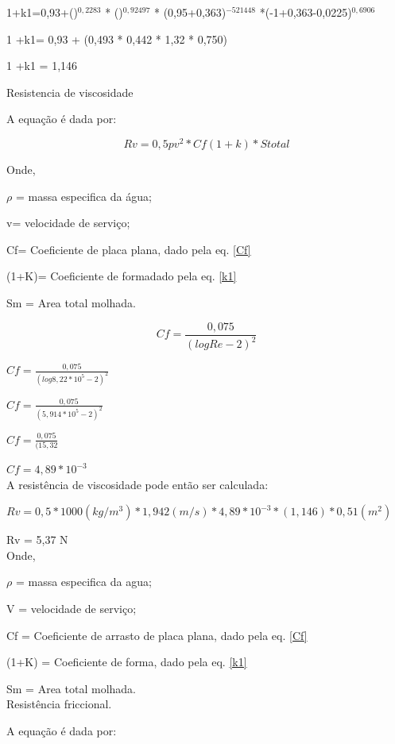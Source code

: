  1+k1=0,93+()$^{0,2283}$  * ()$^{0,92497}$  * (0,95+0,363)$^{-521448}$  *(-1+0,363-0,0225)$^{0,6906}$

1 +k1= 0,93 + (0,493 * 0,442 * 1,32 * 0,750)

1 +k1  = 1,146

Resistencia de viscosidade

A equação é dada por:

\begin{equation} \label{Rv}
   Rv = 0,5pv^2 * Cf(1+k)*Stotal
\end{equation}
 

Onde, 

$\rho$ = massa especifica da água;

v= velocidade de serviço;

Cf= Coeficiente de placa plana, dado pela eq. \ref{Cf}

(1+K)= Coeficiente de formadado pela eq. \ref{k1}

Sm = Area total molhada.


\begin{equation} \label{Cf}
	Cf=\frac{0,075}{(log Re-2)^2}
\end{equation}



$Cf = \frac{0,075}{(log 8,22 * 10^{5}-2)^{2}}$

$Cf = \frac{0,075}{(5,914 * 10^{5}-2)^{2}}$

$Cf = \frac{0,075}{(15,32}$

$Cf = 4,89 * 10^{-3 }  $\\


A resistência de viscosidade pode então ser calculada:  
  
$Rv=0,5 * 1000 (kg/m^{3}) * 1,942(m/s)* 4,89 * 10^{-3} * (1,146) * 0,51 (m^{2})$

Rv = 5,37 N\\

Onde, 

$\rho$ = massa especifica da agua;

V = velocidade de serviço;

Cf = Coeficiente de arrasto de placa plana, dado pela eq. \ref{Cf}

(1+K) = Coeficiente de forma, dado pela eq. \ref{k1}

Sm = Area total molhada.\\
   
Resistência friccional.

A equação é dada por:

